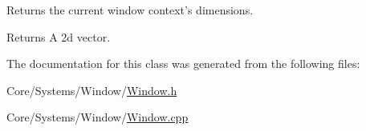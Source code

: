 Returns the current window context's dimensions. 

\begin{DoxyReturn}{Returns}
A 2d vector. 
\end{DoxyReturn}


The documentation for this class was generated from the following files\-:\begin{DoxyCompactItemize}
\item 
Core/\-Systems/\-Window/\hyperlink{Window_8h}{Window.\-h}\item 
Core/\-Systems/\-Window/\hyperlink{Window_8cpp}{Window.\-cpp}\end{DoxyCompactItemize}
